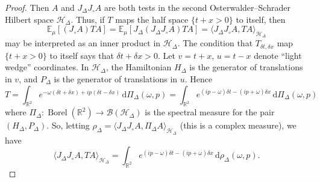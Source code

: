 \documentclass[11pt, letterpaper, reqno]{amsart}
\theoremstyle{definition}
\theoremstyle{remark}
\newcommand{\bbE}{\mathbb{E}}
\newcommand{\bbR}{\mathbb{R}}
\newcommand{\calB}{\mathcal{B}}
\newcommand{\calH}{\mathcal{H}}
\newcommand{\dd}{\,\mathrm{d}}
\begin{document}
\begin{proof}
    Then $A$ and $J_\Delta J_\circ A$ are both tests in the  second Osterwalder--Schrader Hilbert space $\calH_\Delta$. Thus, if $T$ maps the half space $\{t+x>0\}$ to itself, then
    \begin{equation}
        \bbE_\mu[(J_\circ A)T A ] =\bbE_\mu[J_\Delta (J_\Delta J_\circ A)T A ] = \langle J_\Delta J_\circ A,TA \rangle_{\calH_{\Delta}}
    \end{equation}
    may be interpreted as an inner product in $\calH_\Delta$. 
    The condition that $T_{\delta t,\delta x}$ map $\{t+x>0\}$ to itself says that $\delta t+\delta x>0$. Let $v=t+x$, $u=t-x$ denote ``light wedge'' coordinates. 
    In $\calH_\Delta$, the Hamiltonian $H_\Delta$ is the generator of translations in $v$, and $P_\Delta$ is the generator of translations in $u$. Hence 
    \begin{equation}
        T = \int_{\bbR^2} e^{- \omega (\delta t+\delta x) + i p (\delta t-\delta x)} \dd \Pi_\Delta(\omega,p) = \int_{\bbR^2} e^{ (ip-\omega) \delta t - (ip+\omega) \delta x} \dd \Pi_\Delta(\omega ,p) 
    \end{equation}
    where $\Pi_\Delta:\operatorname{Borel}(\bbR^2)\to \calB(\calH_\Delta)$ is the spectral measure for the pair $(H_\Delta,P_\Delta)$. So, letting $\rho_\Delta = \langle J_\Delta J_\circ A, \Pi_\Delta A \rangle_{\calH_\Delta}$
    (this is a complex measure), we have 
    \begin{equation}
        \langle J_\Delta J_\circ A,TA \rangle_{\calH_{\Delta}} = \int_{\bbR^2} e^{(ip-\omega) \delta t - (ip+\omega) \delta x} \dd \rho_\Delta(\omega,p)  .
    \end{equation}


\end{proof}
\end{document}
